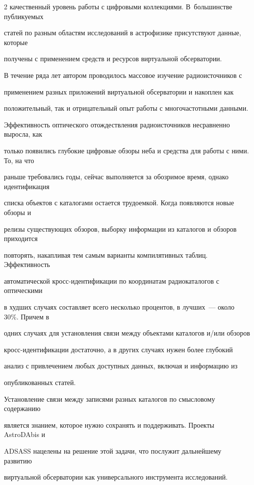 \begin{multicols}{2}
качественный уровень работы с цифровыми коллекциями. В~большинстве публикуемых 

статей по разным областям исследований в астрофизике присутствуют данные, которые 

получены с применением средств и ресурсов виртуальной обсерватории. 

      

      В течение ряда лет автором проводилось массовое изучение радиоисточников с 

применением разных приложений виртуальной обсерватории и накоплен как 

положительный, так и отрицательный опыт работы с многочастотными данными. 

Эффективность оптического отождествления радиоисточников несравненно выросла, как 

только появились глубокие цифровые обзоры неба и средства для работы с ними. То, на что 

раньше требовались годы, сейчас выполняется за обозримое время, однако идентификация 

списка объектов с каталогами остается трудоемкой. Когда появляются новые обзоры и 

релизы существующих обзоров, выборку информации из каталогов и обзоров приходится 

повторять, накапливая тем самым варианты компилятивных таблиц. Эффективность 

автоматической кросс-иден\-ти\-фи\-ка\-ции по координатам радиокаталогов с оптическими 

в худших случаях составляет всего несколько процентов, в лучших~--- около 30\%. Причем в 

одних случаях для установления связи между объектами каталогов и/или обзоров 

      кросс-иден\-ти\-фи\-ка\-ции достаточно, а в других случаях нужен более глубокий 

анализ с привлечением любых доступных данных, включая и информацию из 

опубликованных статей. 

      

      Установление связи между записями разных каталогов по смысловому содержанию 

является знанием, которое нужно сохранять и поддерживать. Проекты AstroDAbis и 

ADSASS нацелены на решение этой задачи, что послужит дальнейшему развитию 

виртуальной обсерватории как универсального инструмента исследований.


\end{multicols}
